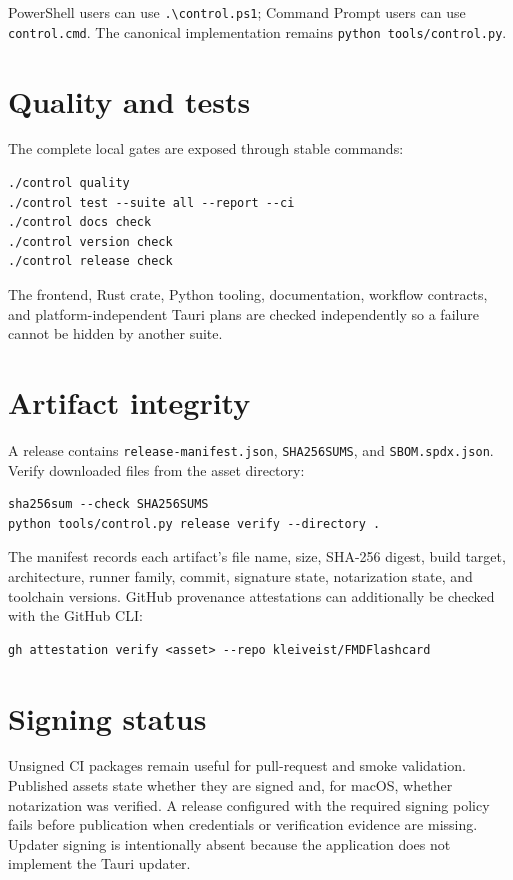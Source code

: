 \documentclass[11pt,a4paper]{article}
\newcommand{\command}[1]{\texttt{#1}}
\begin{document}
PowerShell users can use \command{.\textbackslash control.ps1}; Command Prompt
users can use \command{control.cmd}. The canonical implementation remains
\command{python tools/control.py}.

\section{Quality and tests}

The complete local gates are exposed through stable commands:

\begin{verbatim}
./control quality
./control test --suite all --report --ci
./control docs check
./control version check
./control release check
\end{verbatim}

The frontend, Rust crate, Python tooling, documentation, workflow contracts,
and platform-independent Tauri plans are checked independently so a failure
cannot be hidden by another suite.

\section{Artifact integrity}

A release contains \command{release-manifest.json}, \command{SHA256SUMS}, and
\command{SBOM.spdx.json}. Verify downloaded files from the asset directory:

\begin{verbatim}
sha256sum --check SHA256SUMS
python tools/control.py release verify --directory .
\end{verbatim}

The manifest records each artifact's file name, size, SHA-256 digest, build
target, architecture, runner family, commit, signature state, notarization
state, and toolchain versions. GitHub provenance attestations can additionally
be checked with the GitHub CLI:

\begin{verbatim}
gh attestation verify <asset> --repo kleiveist/FMDFlashcard
\end{verbatim}

\section{Signing status}

Unsigned CI packages remain useful for pull-request and smoke validation.
Published assets state whether they are signed and, for macOS, whether
notarization was verified. A release configured with the required signing
policy fails before publication when credentials or verification evidence are
missing. Updater signing is intentionally absent because the application does
not implement the Tauri updater.
\end{document}
